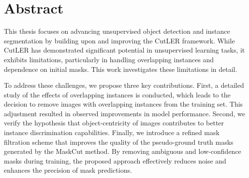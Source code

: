 \chapter*{Abstract}
This thesis focuses on advancing unsupervised object detection and instance segmentation by building upon and improving the CutLER framework. While CutLER has demonstrated significant potential in unsupervised learning tasks, it exhibits limitations, particularly in handling overlapping instances and dependence on initial masks. This work investigates these limitations in detail.

To address these challenges, we propose three key contributions. First, a detailed study of the effects of overlapping instances is conducted, which leads to the decision to remove images with overlapping instances from the training set. This adjustment resulted in observed improvements in model performance. Second, we verify the hypothesis that object-centricity of images contributes to better instance discrimination capabilities.  Finally, we introduce a refined mask filtration scheme that improves the quality of the pseudo-ground truth masks generated by the MaskCut method. By removing ambiguous and low-confidence masks during training, the proposed approach effectively reduces noise and enhances the precision of mask predictions.

